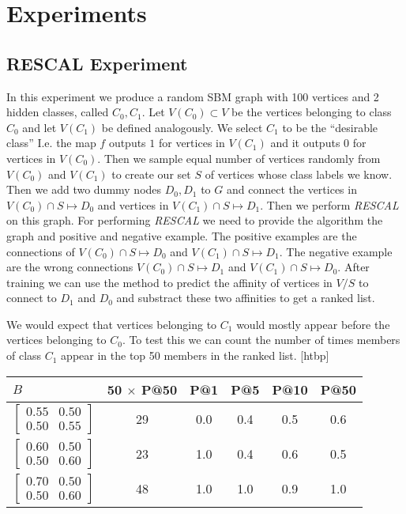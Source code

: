 \documentclass{tufte-handout}
\makeatletter
\renewenvironment{table}[1][htbp]{%
\@tufte@orig@float{table}[#1]}{%
\@tufte@orig@endfloat}%
\makeatother
\begin{document}
\section{Experiments}
\label{sec:experiments}
\subsection{RESCAL Experiment}
\label{sec:simple-experiment}
In this experiment we produce a random SBM graph with 100 vertices and
2 hidden classes, called $C_0, C_1$. Let $V(C_0) \subset V$
be the vertices belonging to class $C_0$ and let $V(C_1)$ be defined
analogously. We select $C_1$ to be the ``desirable class''
I.e. the map $f$ outputs $1$ for vertices in $V(C_1)$
and it outputs $0$ for vertices in $V(C_0)$.
Then we sample equal number of vertices randomly from $V(C_0)$ and $V(C_1)$
to create our set $S$ of vertices whose class labels we know.
Then we add two dummy nodes $D_0, D_1$ to $G$ and connect
the vertices in $V(C_0) \cap S \mapsto D_0$ and
vertices in $V(C_1) \cap S \mapsto D_1$.
Then we perform \textit{RESCAL} on this graph.
For performing \textit{RESCAL} we need to provide the algorithm
the graph and positive and negative example.
The positive examples are the connections of $V(C_0) \cap S \mapsto D_0$
and $V(C_1) \cap S \mapsto D_1$. The negative example are the
wrong connections $V(C_0) \cap S \mapsto D_1$ and $V(C_1) \cap S \mapsto D_0$.
After training we can use the method to predict the affinity of vertices
in $V/S$ to connect to $D_1$ and $D_0$ and substract these two affinities
to get a ranked list.

We would expect that vertices belonging to $C_1$ would mostly appear before the
vertices belonging to $C_0$. To test this we can count the number of times
members of class $C_1$ appear in the top 50 members in the ranked list.
\pagebreak
\begin{table}[htbp]
  \begin{tabular}{l c c c c c}
    $B$ & 50 $\times$ P@50 & P@1 & P@5 & P@10 & P@50 \\ \toprule
  $\begin{bmatrix} 0.55 & 0.50 \\0.50 &0.55 \end{bmatrix}$ & 29 & 0.0 & 0.4 & 0.5 & 0.6 \\
  $\begin{bmatrix} 0.60 & 0.50 \\0.50 &0.60 \end{bmatrix}$ & 23 & 1.0 & 0.4 & 0.6 & 0.5 \\
  $\begin{bmatrix} 0.70 & 0.50 \\0.50 &0.60 \end{bmatrix}$ & 48 & 1.0 & 1.0 & 0.9 & 1.0 \\
  \end{tabular}
  \caption{Performance vs B Matrix. RESCAL Algorithm. Seed=0, Directed, Training Size=20}
  \label{tab:perf-vs-b-1}
\end{table}
\end{document}
